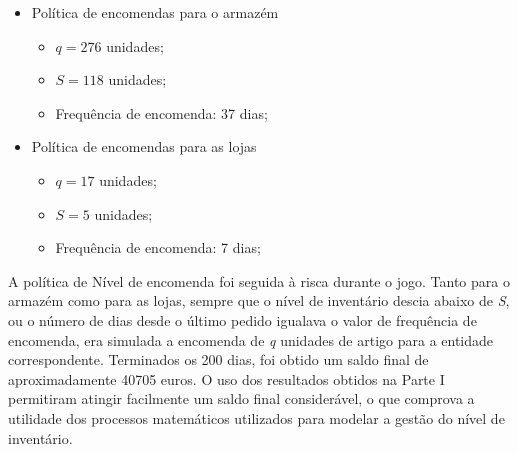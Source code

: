 \begin{itemize}
	\item Política de encomendas para o armazém
		\begin{itemize}
			\item $q = 276$ unidades;
			\item $S = 118$ unidades;
			\item Frequência de encomenda: 37 dias;
		\end{itemize}
	\item Política de encomendas para as lojas
		\begin{itemize}
			\item $q = 17$ unidades;
			\item $S = 5 $ unidades;
			\item Frequência de encomenda: 7 dias;
		\end{itemize}
\end{itemize}

A política de Nível de encomenda foi seguida à risca durante o jogo. Tanto para
o armazém como para as lojas, sempre que o nível de inventário descia abaixo de
\emph{S}, ou o número de dias desde o último pedido igualava o valor de frequência de
encomenda, era simulada a encomenda de \emph{q} unidades de artigo para a entidade
correspondente. Terminados os 200 dias, foi obtido um saldo final de
aproximadamente 40705 euros. O uso dos resultados obtidos na Parte I permitiram
atingir facilmente um saldo final considerável, o que comprova a utilidade dos
processos matemáticos utilizados para modelar a gestão do nível de inventário.




